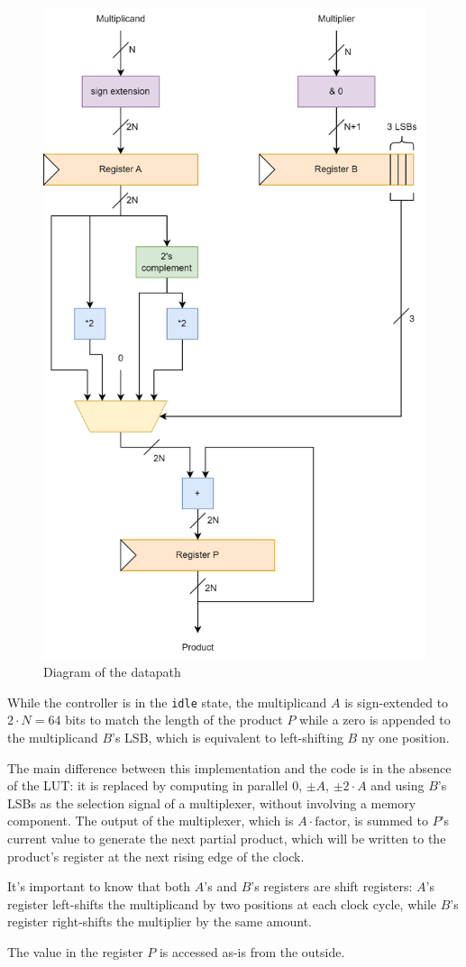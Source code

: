 \begin{figure}
    \centering
    \includegraphics[width=0.8\linewidth]{images/boothDatapath.png}
    \caption{Diagram of the datapath}
    \label{fig:booth_mul_datapath}
\end{figure}

While the controller is in the \texttt{idle} state, the multiplicand $A$ is sign-extended to $2 \cdot N = 64$ bits to match the length of the product $P$ while a zero is appended to the multiplicand $B$'s LSB, which is equivalent to left-shifting $B$ ny one position.

The main difference between this implementation and the code is in the absence of the LUT: it is replaced by computing in parallel $0$, $\pm A$, $\pm 2 \cdot A$ and using $B$'s LSBs as the selection signal of a multiplexer, without involving a memory component.
The output of the multiplexer, which is $A \cdot \text{factor}$, is summed to $P$'s current value to generate the next partial product, which will be written to the product's register at the next rising edge of the clock.

It's important to know that both $A$'s and $B$'s registers are shift registers: $A$'s register left-shifts the multiplicand by two positions at each clock cycle, while $B$'s register right-shifts the multiplier by the same amount.

The value in the register $P$ is accessed as-is from the outside.